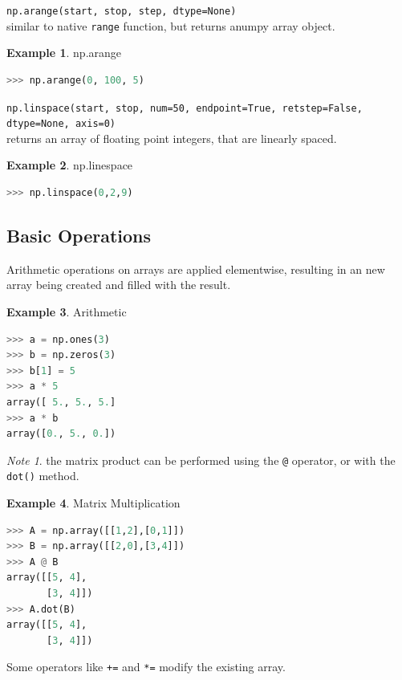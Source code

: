 \documentclass{article}
\theoremstyle{definition}
\newtheorem{ex}{Example}[subsection]
\theoremstyle{remark}
\newtheorem*{nb}{Note}
\newcommand{\func}[2]{\noindent\lstinline{#1}\\#2}
\begin{document}
\func{np.arange(start, stop, step, dtype=None)}{similar to native \lstinline{range} function, but returns anumpy array object.}

\begin{ex} np.arange
\begin{lstlisting}[language=Python]
>>> np.arange(0, 100, 5)
\end{lstlisting}
\end{ex}

\func{np.linspace(start, stop, num=50, endpoint=True, retstep=False, dtype=None, axis=0)}{returns an array of floating point integers, that are linearly spaced.}

\begin{ex} np.linespace
\begin{lstlisting}[language=Python]
>>> np.linspace(0,2,9)
\end{lstlisting}
\end{ex}


\break

\subsection{Basic Operations}

Arithmetic operations on arrays are applied elementwise, resulting in an new array being created and filled with the result.

\begin{ex} Arithmetic
\begin{lstlisting}[language=Python]
>>> a = np.ones(3)
>>> b = np.zeros(3)
>>> b[1] = 5
>>> a * 5
array([ 5., 5., 5.]
>>> a * b
array([0., 5., 0.])
\end{lstlisting}
\end{ex}

\begin{nb}
    the matrix product can be performed using the \lstinline{@} operator, or with the \lstinline{dot()} method.
\end{nb}

\begin{ex} Matrix Multiplication
\begin{lstlisting}[language=Python]
>>> A = np.array([[1,2],[0,1]])
>>> B = np.array([[2,0],[3,4]])
>>> A @ B
array([[5, 4],
       [3, 4]])
>>> A.dot(B)
array([[5, 4],
       [3, 4]])
\end{lstlisting}
\end{ex}

\noindent
Some operators like \lstinline{+=} and \lstinline{*=} modify the existing array.
\end{document}
